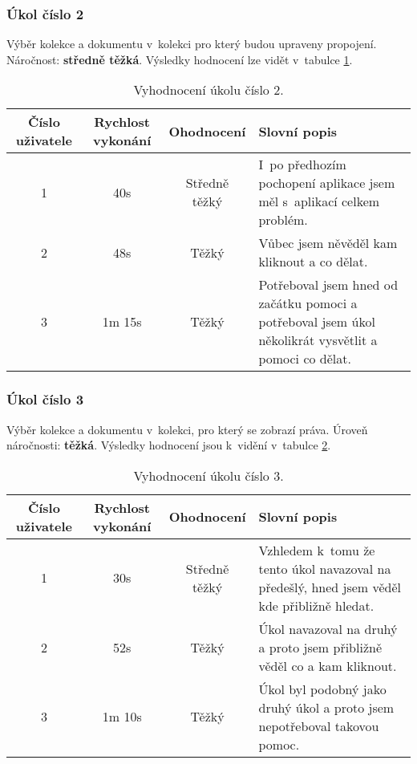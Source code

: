 \subsubsection{Úkol číslo 2} Výběr kolekce a dokumentu v~kolekci pro který budou upraveny propojení. Náročnost: \textbf{středně těžká}. Výsledky hodnocení lze vidět v~tabulce \ref{ukol-2}.
\begin{table}[htp]
\begin{center}
\begin{tabular}{ || c || c | c | m{5cm} || }
\hline
Číslo uživatele & Rychlost vykonání & Ohodnocení & Slovní popis \\ [0.5ex]
\hline
\hline
1 & 40s & Středně těžký & I~po předhozím pochopení aplikace jsem měl s~aplikací celkem problém.\\
\hline
2 & 48s & Těžký & Vůbec jsem něvěděl kam kliknout a co dělat. \\
\hline
3 & 1m 15s & Těžký & Potřeboval jsem hned od začátku pomoci a potřeboval jsem úkol několikrát vysvětlit a pomoci co dělat. \\
\hline
\end{tabular}
\end{center}
\caption{Vyhodnocení úkolu číslo 2.}
\label{ukol-2}
\end{table}
\subsubsection{Úkol číslo 3} Výběr kolekce a dokumentu v~kolekci, pro který se zobrazí práva. Úroveň náročnosti: \textbf{těžká}. Výsledky hodnocení jsou k~vidění v~tabulce \ref{ukol-3}.
\begin{table}[htp]
\begin{center}
\begin{tabular}{ || c || c | c | m{5cm} || }
\hline
Číslo uživatele & Rychlost vykonání & Ohodnocení & Slovní popis \\ [0.5ex]
\hline
\hline
1 & 30s & Středně těžký & Vzhledem k~tomu že tento úkol navazoval na předešlý, hned jsem věděl kde přibližně hledat. \\
\hline
2 & 52s & Těžký & Úkol navazoval na druhý a proto jsem přibližně věděl co a kam kliknout. \\
\hline
3 & 1m 10s & Těžký & Úkol byl podobný jako druhý úkol a proto jsem nepotřeboval takovou pomoc. \\
\hline
\end{tabular}
\end{center}
\caption{Vyhodnocení úkolu číslo 3.}
\label{ukol-3}
\end{table}

